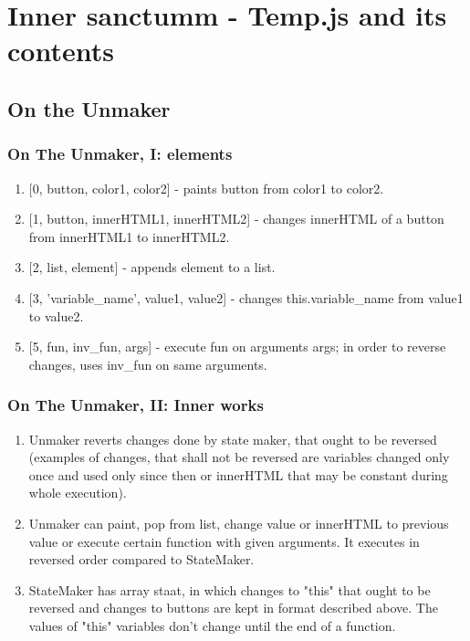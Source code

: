 \documentclass[12pt]{article}
\begin{document}
\section {Inner sanctumm - Temp.js and its contents}


\subsection {On the Unmaker}
\subsubsection{On The Unmaker, I: elements}
\begin {enumerate}
	\item {[0, button, color1, color2]} - paints button from color1 to color2.
	\item {[1, button, innerHTML1, innerHTML2]} - changes innerHTML of a button from innerHTML1 to innerHTML2.
	\item {[2, list, element]} - appends element to a list.
	\item {[3, 'variable\_name', value1, value2]} - changes this.variable\_name from value1 to value2.
	\item {[5, fun, inv\_fun, args]} - execute fun on arguments args; in order to reverse changes, uses inv\_fun on same arguments.
\end{enumerate}

\subsubsection{On The Unmaker, II: Inner works}
\begin {enumerate}
	\item Unmaker reverts changes done by state maker, that ought to be reversed (examples of changes, that shall not be reversed are variables changed only once and used only since then or innerHTML that may be constant during whole execution).
	\item Unmaker can paint, pop from list, change value or innerHTML to previous value or execute certain function with given arguments. It executes in reversed order compared to StateMaker.
	\item StateMaker has array staat, in which changes to "this" that ought to be reversed and changes to buttons are kept in format described above. The values of "this" variables don't change until the end of a function.
\end {enumerate}
\end{document}
